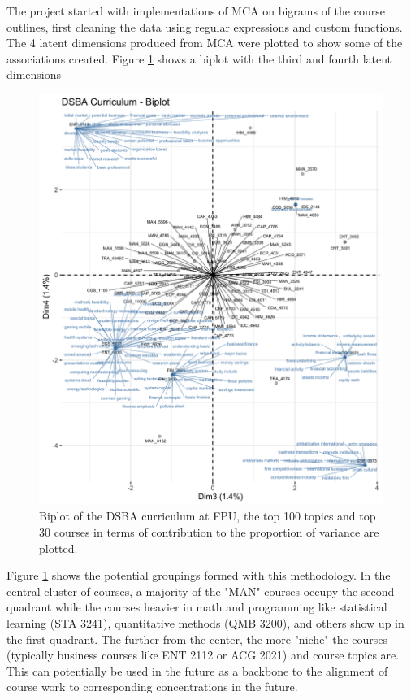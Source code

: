 The project started with implementations of MCA on bigrams of the course outlines,  first cleaning the data using regular expressions \cite{regex} and custom functions.  The 4 latent dimensions produced from MCA were plotted to show some of the associations created.  Figure \ref{fig:mca_2} shows a biplot with the third and fourth latent dimensions


\begin{figure}[H]
\centering

\includegraphics[width = 1\textwidth, height = .9\textheight]{Content/images/mca_bp_2.png}
\caption{Biplot of the DSBA curriculum at FPU,  the top 100 topics and top 30 courses in terms of contribution to the proportion of variance are plotted.}
\label{fig:mca_2}
\end{figure}

Figure \ref{fig:mca_2} shows the potential groupings formed with this methodology.  In the central cluster of courses, a majority of the "MAN" courses occupy the second quadrant while the courses heavier in math and programming like statistical learning (STA 3241),  quantitative methods (QMB 3200), and others show up in the first quadrant.  The further from the center, the more "niche" the courses (typically business courses like ENT 2112 or ACG 2021) and course topics are.  This can potentially be used in the future as a backbone to the alignment of course work to corresponding concentrations in the future.

